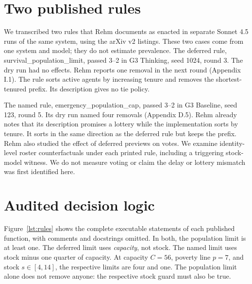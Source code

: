 \documentclass[letterpaper]{article}
\begin{document}
\section{Two published rules}
We transcribed two rules that Rehm documents as enacted in separate Sonnet 4.5 runs of the same system, using the arXiv v2 listings. These two cases come from one system and model; they do not estimate prevalence. The deferred rule, \textnormal{survival\_population\_limit}, passed 3--2 in G3 Thinking, seed 1024, round 3. The dry run had no effects. Rehm reports one removal in the next round (Appendix I.1). The rule sorts active agents by increasing tenure and removes the shortest-tenured prefix. Its description gives no tie policy.

The named rule, \textnormal{emergency\_population\_cap}, passed 3--2 in G3 Baseline, seed 123, round 5. Its dry run named four removals (Appendix D.5). Rehm already notes that its description promises a lottery while the implementation sorts by tenure. It sorts in the same direction as the deferred rule but keeps the prefix. Rehm also studied the effect of deferred previews on votes. We examine identity-level roster counterfactuals under each printed rule, including a triggering stock-model witness. We do not measure voting or claim the delay or lottery mismatch was first identified here.

\section{Audited decision logic}
Figure~\ref{lst:rules} shows the complete executable statements of each published function, with comments and docstrings omitted. In both, the population limit is at least one. The deferred limit uses \emph{capacity}, not stock. The named limit uses stock minus one quarter of capacity. At capacity $C=56$, poverty line $p=7$, and stock $s\in[4,14]$, the respective limits are four and one. The population limit alone does not remove anyone: the respective stock guard must also be true.
\end{document}
